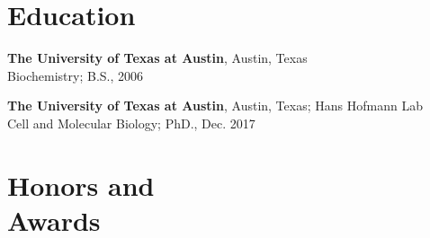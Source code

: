 \documentclass[margin,line]{resume}
\begin{document}
\pagestyle{plain}

\begin{resume}




    \section{\mysidestyle Education} 

\begin{description}[leftmargin=0pt] 
\setlength{\itemsep}{4pt}
\item[] {\bf The University of Texas at Austin}, Austin, Texas \\Biochemistry; B.S., 2006
\item[] {\bf The University of Texas at Austin}, Austin, Texas; Hans Hofmann Lab
\\Cell and Molecular Biology; PhD., Dec. 2017
\end{description}
    
    \section{\mysidestyle Honors and\\Awards} 


\end{resume}
\end{document}
